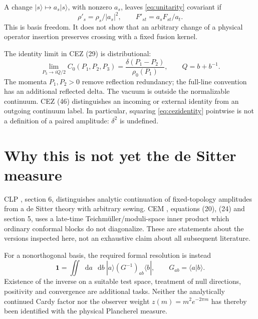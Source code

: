 \documentclass[11pt,a4paper]{article}
\newcommand{\dd}{\mathop{}\!\mathrm d}
\newcommand{\Id}{\mathbf 1}
\begin{document}
A change \(|s\rangle\mapsto a_s|s\rangle\), with nonzero \(a_s\),
leaves \eqref{eq:unitarity} covariant if
\begin{equation}
 \rho'_s=\rho_s/|a_s|^2,\qquad F'_{st}=a_sF_{st}/a_t.
\end{equation}
This is basis freedom. It does not show that an arbitrary change
of a physical operator insertion preserves crossing with a fixed
fusion kernel.

The identity limit in CEZ (29) is distributional:
\begin{equation}
 \lim_{P_3\to iQ/2}C_0(P_1,P_2,P_3)
 =\frac{\delta(P_1-P_2)}{\rho_0(P_1)},\qquad Q=b+b^{-1}.
 \label{eq:cezidentity}
\end{equation}
The momenta \(P_1,P_2>0\) remove reflection redundancy; the
full-line convention has an additional reflected delta.
The vacuum is outside the normalizable continuum. CEZ (46)
distinguishes an incoming or external identity from an outgoing
continuum label. In particular, squaring
\eqref{eq:cezidentity} pointwise is not a definition of a paired
amplitude: \(\delta^2\) is undefined.

\section{Why this is not yet the de Sitter measure}
CLP \cite{clp}, section 6, distinguishes analytic continuation of
fixed-topology amplitudes from a de Sitter theory with arbitrary
sewing. CEM \cite{cem}, equations (20), (24) and section 5,
uses a late-time Teichm\"uller/moduli-space inner product which
ordinary conformal blocks do not diagonalize.
These are statements about the versions inspected here, not an
exhaustive claim about all subsequent literature.

For a nonorthogonal basis, the required formal resolution is instead
\begin{equation}
 \Id=\iint\dd a\,\dd b\ |a\rangle(G^{-1})_{ab}\langle b|,
 \qquad G_{ab}=\langle a|b\rangle. \label{eq:gram}
\end{equation}
Existence of the inverse on a suitable test space, treatment of
null directions, positivity and convergence are additional tasks.
Neither the analytically continued Cardy factor nor the observer
weight \(z(m)=m^2e^{-2\pi m}\) has thereby been identified with the
physical Plancherel measure.
\end{document}
